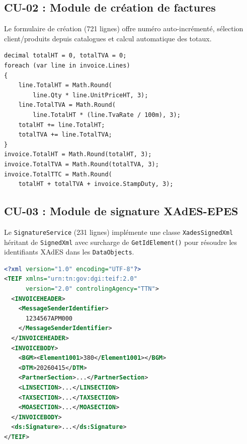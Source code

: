 \documentclass[a4paper,12pt]{report}
\begin{document}

\subsection{CU-02 : Module de création de factures}

Le formulaire de création (721 lignes) offre numéro auto-incrémenté, sélection client/produits depuis catalogues et calcul automatique des totaux.

\begin{lstlisting}[language={[Sharp]C}, caption={Recalcul des totaux (InvoicesController.cs)}]
decimal totalHT = 0, totalTVA = 0;
foreach (var line in invoice.Lines)
{
    line.TotalHT = Math.Round(
        line.Qty * line.UnitPriceHT, 3);
    line.TotalTVA = Math.Round(
        line.TotalHT * (line.TvaRate / 100m), 3);
    totalHT += line.TotalHT;
    totalTVA += line.TotalTVA;
}
invoice.TotalHT = Math.Round(totalHT, 3);
invoice.TotalTVA = Math.Round(totalTVA, 3);
invoice.TotalTTC = Math.Round(
    totalHT + totalTVA + invoice.StampDuty, 3);
\end{lstlisting}

\subsection{CU-03 : Module de signature XAdES-EPES}

Le \texttt{SignatureService} (231 lignes) implémente une classe \texttt{XadesSignedXml} héritant de \texttt{SignedXml} avec surcharge de \texttt{GetIdElement()} pour résoudre les identifiants XAdES dans les \texttt{DataObjects}.

\begin{lstlisting}[language=XML, caption={Structure XML TEIF v2.0}]
<?xml version="1.0" encoding="UTF-8"?>
<TEIF xmlns="urn:tn:gov:dgi:teif:2.0"
      version="2.0" controlingAgency="TTN">
  <INVOICEHEADER>
    <MessageSenderIdentifier>
      1234567APM000
    </MessageSenderIdentifier>
  </INVOICEHEADER>
  <INVOICEBODY>
    <BGM><Element1001>380</Element1001></BGM>
    <DTM>20260415</DTM>
    <PartnerSection>...</PartnerSection>
    <LINSECTION>...</LINSECTION>
    <TAXSECTION>...</TAXSECTION>
    <MOASECTION>...</MOASECTION>
  </INVOICEBODY>
  <ds:Signature>...</ds:Signature>
</TEIF>
\end{lstlisting}
\end{document}
